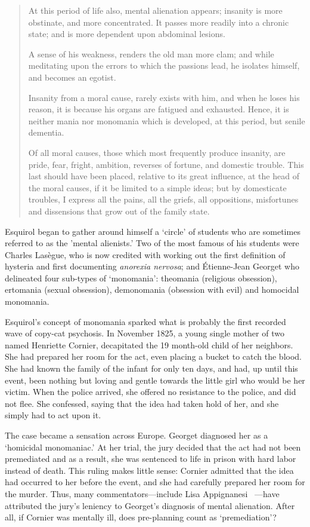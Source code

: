\begin{refsection}
\begin{quote}
At this period of life also, mental alienation appears; insanity is more obstinate, and more concentrated. It passes more readily into a chronic state; and is more dependent upon abdominal lesions.

A sense of his weakness, renders the old man more clam; and while meditating upon the errors to which the passions lead, he isolates himself, and becomes an egotist.

Insanity from a moral cause, rarely exists with him, and when he loses his reason, it is because his organs are fatigued and exhausted. Hence, it is neither mania nor monomania which is developed, at this period, but senile dementia.

Of all moral causes, those which most frequently produce insanity, are pride, fear, fright, ambition, reverses of fortune, and domestic trouble. This last should have been placed, relative to its great influence, at the head of the moral causes, if it be limited to a simple ideas; but by domesticate troubles, I express all the pains, all the griefs, all oppositions, misfortunes and dissensions that grow out of the family state.
~\citep[P. 45--46]{Esquirol:1845ug}
\end{quote}

Esquirol began to gather around himself a `circle' of students who are sometimes referred to as the 'mental alienists.’ Two of the most famous of his students were Charles Lasègue, who is now credited with working out the first definition of hysteria and first documenting \emph{anorexia nervosa}; and Étienne-Jean Georget who delineated four sub-types of `monomania': theomania (religious obsession), ertomania (sexual obsession), demonomania (obsession with evil) and homocidal monomania.

Esquirol's concept of monomania sparked what is probably the first recorded wave of copy-cat psychosis. In November 1825, a young single mother of two named Henriette Cornier, decapitated the 19 month-old child of her neighbors. She had prepared her room for the act, even placing a bucket to catch the blood. She had known the family of the infant for only ten days, and had, up until this event, been nothing but loving and gentle towards the little girl who would be her victim. When the police arrived, she offered no resistance to the police, and did not flee. She confessed, saying that the idea had taken hold of her, and she simply had to act upon it.

The case became a sensation across Europe. Georget diagnosed her as a `homicidal monomaniac.' At her trial, the jury decided that the act had not been premediated and as a result, she was sentenced to life in prison with hard labor instead of death. This ruling makes little sense: Cornier admitted that the idea had occurred to her before the event, and she had carefully prepared her room for the murder. Thus, many commentators---include Lisa Appignanesi ~\citep[p 75]{Appignanesi:2009vl}---have attributed the jury’s leniency to Georget's diagnosis of mental alienation. After all, if Cornier was mentally ill, does pre-planning count as `premediation'?


\end{refsection}
